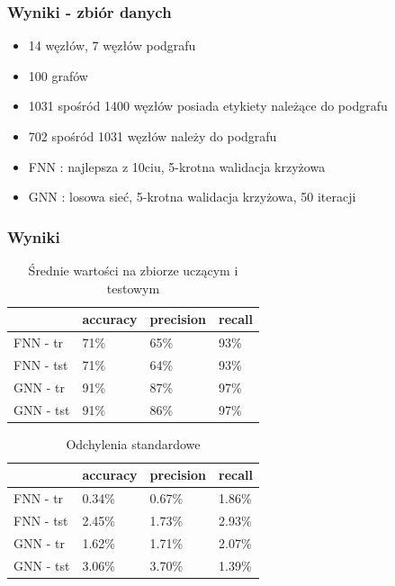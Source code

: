 \documentclass{beamer}
\begin{document}
\begin{frame}
\frametitle{Wyniki - zbiór danych}
\begin{itemize}
	\item 14 węzłów, 7 węzłów podgrafu
	\item 100 grafów
	\item 1031 spośród 1400 węzłów posiada etykiety należące do podgrafu
	\item 702 spośród 1031 węzłów należy do podgrafu
	\item FNN : najlepsza z 10ciu, 5-krotna walidacja krzyżowa
	\item GNN : losowa sieć, 5-krotna walidacja krzyżowa, 50 iteracji
\end{itemize}
\end{frame}

\begin{frame}
\frametitle{Wyniki}
\setlength{\tabcolsep}{2pt}
\begin{table}[h!]
	\begin{center}
	\begin{tabular}{llll}
	\toprule
	& accuracy & precision & recall \\
	\midrule
	FNN - tr &	71\% &  65\% & 93\% \\
	FNN - tst &	71\% &  64\% &  93\% \\
	GNN - tr &	91\% &  87\%&  97\% \\
	GNN - tst &	91\% &  86\% &  97\% \\
	\bottomrule
	\end{tabular}
	\caption{Średnie wartości na zbiorze uczącym i testowym}
	\end{center}
\end{table}

\begin{table}[h!]
	\begin{center}
	\begin{tabular}{llll}
	\toprule
	& accuracy & precision & recall \\
	\midrule
	FNN - tr &	0.34\% &  0.67\% & 1.86\% \\
	FNN - tst &	2.45\% &  1.73\% &  2.93\% \\
	GNN - tr &	1.62\% &  1.71\% &  2.07\% \\
	GNN - tst &	3.06\% &  3.70\% &  1.39\% \\
	\bottomrule
	\end{tabular}
	\caption{Odchylenia standardowe}
	\end{center}
\end{table}
\end{frame}
\end{document}

